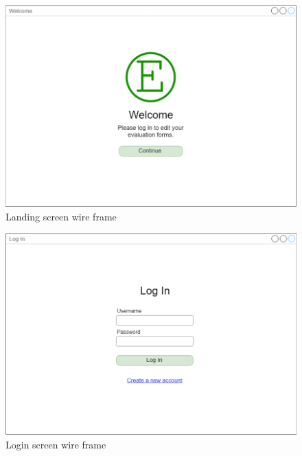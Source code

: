 \documentclass{article}
\begin{document}
\vspace{1in}
\begin{center}
\begin{figure}
    \centering
    \includegraphics[scale=.3]{images/landing_screen.png}
    \caption{Landing screen wire frame}
    \label{fig:my_label}
\end{figure}
\end{center}

\begin{center}
\begin{figure}
    \centering
    \includegraphics[scale=.3]{images/login_screen.png}
    \caption{Login screen wire frame}
    \label{fig:my_label}
\end{figure}
\end{center}
\end{document}
